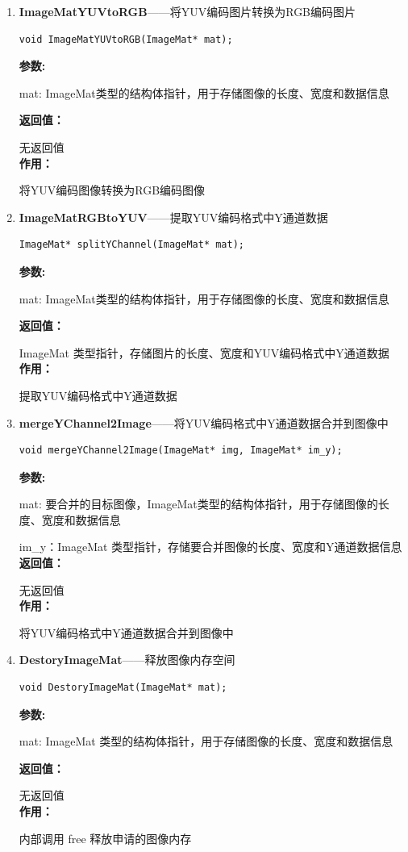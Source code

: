 \documentclass[12pt, a4paper, oneside]{ctexbook}
\begin{document}
\begin{enumerate}
			\item \textbf{ImageMatYUVtoRGB}——将YUV编码图片转换为RGB编码图片
				\begin{lstlisting}[numbers=none]
void ImageMatYUVtoRGB(ImageMat* mat);
				\end{lstlisting}
				\textbf{参数:} \par mat: ImageMat类型的结构体指针，用于存储图像的长度、宽度和数据信息\par 
				\textbf{返回值：}\par 无返回值 \\
				\textbf{作用：}\par  将YUV编码图像转换为RGB编码图像\\
			
			
			\item \textbf{ImageMatRGBtoYUV}——提取YUV编码格式中Y通道数据
				\begin{lstlisting}[numbers=none]
ImageMat* splitYChannel(ImageMat* mat);
				\end{lstlisting}
				\textbf{参数:} \par mat: ImageMat类型的结构体指针，用于存储图像的长度、宽度和数据信息\par 
				\textbf{返回值：}\par ImageMat 类型指针，存储图片的长度、宽度和YUV编码格式中Y通道数据 \\
				\textbf{作用：}\par 提取YUV编码格式中Y通道数据 \\

			\item \textbf{mergeYChannel2Image}——将YUV编码格式中Y通道数据合并到图像中
				\begin{lstlisting}[numbers=none]
void mergeYChannel2Image(ImageMat* img, ImageMat* im_y);
				\end{lstlisting}
				\textbf{参数:} \par mat: 要合并的目标图像，ImageMat类型的结构体指针，用于存储图像的长度、宽度和数据信息\par im\_y：ImageMat 类型指针，存储要合并图像的长度、宽度和Y通道数据信息 \\
				\textbf{返回值：}\par 无返回值 \\
				\textbf{作用：}\par 将YUV编码格式中Y通道数据合并到图像中 \\			

			\item \textbf{DestoryImageMat}——释放图像内存空间
				\begin{lstlisting}[numbers=none]
void DestoryImageMat(ImageMat* mat);
				\end{lstlisting}
				\textbf{参数:} \par mat: ImageMat 类型的结构体指针，用于存储图像的长度、宽度和数据信息\par 
				\textbf{返回值：}\par 无返回值 \\
				\textbf{作用：}\par 内部调用 free 释放申请的图像内存 \\					
		\end{enumerate}
		
\end{document}
